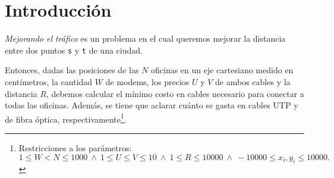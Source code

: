 \section{Introducción}

\textit{Mejorando el tráfico} es un problema en el cual queremos mejorar la distancia entre dos puntos \texttt{s} y \texttt{t} de una ciudad. 

\vspace{1em}

Entonces, dadas las posiciones de las $N$ oficinas en un eje cartesiano medido en centímetros, la cantidad $W$ de modems, los precios $U$ y $V$ de ambos cables y la distancia $R$, debemos calcular el mínimo costo en cables necesario para conectar a todas las oficinas. Además, se tiene que aclarar cuánto se gasta en cables UTP y de fibra óptica, respectivamente\footnote{Restricciones a los parámetros: \\ \indent \indent $1 \leq W < N \leq 1000 \ \wedge \ 1 \leq U \leq V \leq 10 \ \wedge \ 1 \leq R \leq 10000 \ \wedge \  -10000 \leq x_i, y_i \leq 10000. $}.

\vspace{1em}

